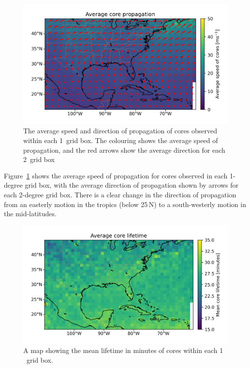 \begin{figure}[tp]
    \centering
    \includegraphics[width=\textwidth]{figures/chapter2_05.png}
    \caption[
    The average speed and direction of propagation of cores
    ]{
    The average speed and direction of propagation of cores observed within each 1\textdegree\ grid box. The colouring shows the average speed of propagation, and the red arrows show the average direction for each 2\textdegree\ grid box}
    \label{fig:core_propagation_map}
\end{figure}

Figure~\ref{fig:core_propagation_map} shows the average speed of propagation for cores observed in each 1-degree grid box, with the average direction of propagation shown by arrows for each 2-degree grid box.
There is a clear change in the direction of propagation from an easterly motion in the tropics (below 25\,\textdegree N) to a south-westerly motion in the mid-latitudes.

\begin{figure}[tp]
    \centering
    \includegraphics[width=\textwidth]{figures/chapter2_06.png}
    \caption[
    A map showing the mean lifetime in minutes of cores within each 1
    \textdegree\ grid box
    ]{
    A map showing the mean lifetime in minutes of cores within each 1
    \textdegree\ grid box.
    }
    \label{fig:core_lifetime_map}
\end{figure}

